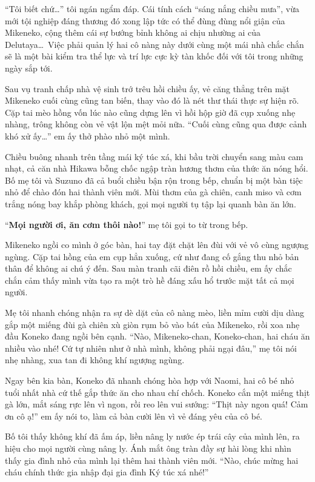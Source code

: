 ﻿\documentclass[../main.tex]{subfiles}
\begin{document}
``Tôi biết chứ\dots'' tôi ngán ngẩm đáp. Cái tính cách ``sáng nắng chiều mưa'', vừa mới tội nghiệp đáng thương đó xong lập tức có thể đùng đùng nổi giận của Mikeneko, cộng thêm cái sự bướng bỉnh không ai chịu nhường ai của Delutaya\dots\ Việc phải quản lý hai cô nàng này dưới cùng một mái nhà chắc chắn sẽ là một bài kiểm tra thể lực và trí lực cực kỳ tàn khốc đối với tôi trong những ngày sắp tới.

\ct

Sau vụ tranh chấp nhà vệ sinh trớ trêu hồi chiều ấy, vẻ căng thẳng trên mặt Mikeneko cuối cùng cũng tan biến, thay vào đó là nét thư thái thực sự hiện rõ. Cặp tai mèo hồng vốn lúc nào cũng dựng lên vì hồi hộp giờ đã cụp xuống nhẹ nhàng, trông không còn vẻ vật lộn mệt mỏi nữa. ``Cuối cùng cũng qua được cảnh khó xử ấy\dots'' em ấy thở phào nhỏ một mình.

Chiều buông nhanh trên tầng mái ký túc xá, khi bầu trời chuyển sang màu cam nhạt, cả căn nhà Hikawa bỗng chốc ngập tràn hương thơm của thức ăn nóng hổi. Bố mẹ tôi và Suzuno đã cả buổi chiều bận rộn trong bếp, chuẩn bị một bàn tiệc nhỏ để chào đón hai thành viên mới. Mùi thơm của gà chiên, canh miso và cơm trắng nóng bay khắp phòng khách, gọi mọi người tụ tập lại quanh bàn ăn lớn.

``\textbf{Mọi người ơi, ăn cơm thôi nào!}'' mẹ tôi gọi to từ trong bếp.

Mikeneko ngồi co mình ở góc bàn, hai tay đặt chặt lên đùi với vẻ vô cùng ngượng ngùng. Cặp tai hồng của em cụp hẳn xuống, cứ như đang cố gắng thu nhỏ bản thân để không ai chú ý đến. Sau màn tranh cãi điên rồ hồi chiều, em ấy chắc chắn cảm thấy mình vừa tạo ra một trò hề đáng xấu hổ trước mặt tất cả mọi người.

Mẹ tôi nhanh chóng nhận ra sự dè dặt của cô nàng mèo, liền mỉm cười dịu dàng gắp một miếng đùi gà chiên xù giòn rụm bỏ vào bát của Mikeneko, rồi xoa nhẹ đầu Koneko đang ngồi bên cạnh. ``Nào, Mikeneko-chan, Koneko-chan, hai cháu ăn nhiều vào nhé! Cứ tự nhiên như ở nhà mình, không phải ngại đâu,'' mẹ tôi nói nhẹ nhàng, xua tan đi không khí ngượng ngùng.

Ngay bên kia bàn, Koneko đã nhanh chóng hòa hợp với Naomi, hai cô bé nhỏ tuổi nhất nhà cứ thế gắp thức ăn cho nhau chí chốch. Koneko cắn một miếng thịt gà lớn, mắt sáng rực lên vì ngon, rồi reo lên vui sướng: ``Thịt này ngon quá! Cảm ơn cô ạ!'' em ấy nói to, làm cả bàn cười lên vì vẻ đáng yêu của cô bé.

Bố tôi thấy không khí đã ấm áp, liền nâng ly nước ép trái cây của mình lên, ra hiệu cho mọi người cùng nâng ly. Ánh mắt ông tràn đầy sự hài lòng khi nhìn thấy gia đình nhỏ của mình lại thêm hai thành viên mới. ``Nào, chúc mừng hai cháu chính thức gia nhập đại gia đình Ký túc xá nhé!''
\end{document}
